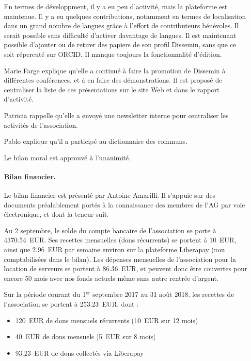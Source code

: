 \documentclass{scrartcl}
\begin{document}
En termes de développment, il y a eu peu d'activité, mais la plateforme est
maintenue. Il y a eu quelques contributions, notamment en termes de
localisation dans un grand nombre de langues grâce à l'effort de contributeurs
bénévoles. Il serait possible sans difficulté d'activer davantage de langues. Il
est maintenant possible d'ajouter ou de retirer des papiers de son profil
Dissemin, sans que ce soit répercuté sur ORCID. Il manque toujours la
fonctionnalité d'édition.

Marie Farge explique qu'elle a continué à faire la promotion de Dissemin à
différentes conférences, et à en faire des démonstrations. Il est proposé de
centraliser la liste de ces présentations sur le site Web et dans le rapport
d'activité.

Patricia rappelle qu'elle a envoyé une newsletter interne pour centraliser les
activités de l'association.

Pablo explique qu'il a participé au dictionnaire des communs.

Le bilan moral est approuvé à l'unanimité.

\paragraph{Bilan financier.} Le bilan financier est présenté par Antoine
Amarilli. Il s'appuie sur des documents préalablement portés à la connaissance des
membres de l'AG par voie électronique, et dont la teneur suit.

Au 2 septembre, le solde du compte bancaire de l'association se porte à
4370.54~EUR. Ses recettes mensuelles (dons récurrents) se portent à 10~EUR,
ainsi que 2.96~EUR par semaine environ sur la plateforme Liberapay (non
comptabilisées dans le bilan). Les dépenses mensuelles de l'association pour la
location de serveurs se portent à 86.36~EUR, et peuvent donc être couvertes pour
encore 50 mois avec nos fonds actuels même sans autre rentrée d'argent.
 
Sur la période courant du 1$^{\mathrm{er}}$ septembre 2017 au 31 août 2018, les
recettes de l'association se portent à 253.23~EUR, dont :

\begin{itemize}
  \item 120~EUR de dons mensuels récurrents (10~EUR sur 12 mois)
  \item 40~EUR de dons mensuels (5~EUR sur 8 mois)
  \item 93.23~EUR de dons collectés via Liberapay
\end{itemize}
\end{document}
